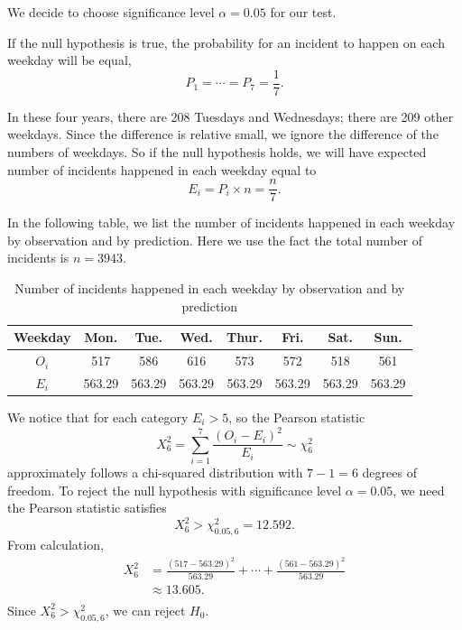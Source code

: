 \documentclass[11pt,a4paper,english]{article}
\begin{document}
We decide to choose significance level $\alpha = 0.05$ for our test.

If the null hypothesis is true, the probability for an incident to happen on each weekday will be equal,
\begin{equation*}
	P_{1} = \cdots = P_{7} = \frac{1}{7}.
\end{equation*}

In these four years, there are 208  Tuesdays and Wednesdays; there are 209 other weekdays. 
Since the difference is relative small, we ignore the difference of the numbers of weekdays.
So if the null hypothesis holds, we will have expected number of incidents happened in each weekday equal to
\begin{equation*}
	E_{i} = P_{i} \times n = \frac{n}{7}.
\end{equation*}

In the following table, we list the number of incidents happened in each weekday by observation and by prediction. 
Here we use the fact the total number of incidents is $n = 3943$.
\begin{table}[htbp]
	\centering
	\begin{tabular}{c|ccccccc}
		\hline
		Weekday & Mon. & Tue. & Wed. & Thur. & Fri. & Sat. & Sun.\\
		\hline
		$O_{i}$ & 517 & 586 & 616 & 573 & 572 & 518 & 561\\ \hline
		$E_{i}$ & 563.29 & 563.29 & 563.29 & 563.29 & 563.29 & 563.29 & 563.29\\
		\hline
	\end{tabular}
	\caption{Number of incidents happened in each weekday by observation and by prediction}
\end{table}

We notice that for each category $E_{i} > 5$, so the Pearson statistic
\begin{equation*}
	X^{2}_{6} = \sum_{i = 1}^{7}\frac{(O_{i} - E_{i})^{2}}{E_{i}}
	\sim \chi^{2}_{6}
\end{equation*}
approximately follows a chi-squared distribution with $7-1 = 6$ degrees of freedom. 
To reject the null hypothesis with significance level $\alpha = 0.05$, we need the Pearson statistic satisfies
\begin{equation*}
	X^{2}_{6} > \chi^{2}_{0.05,6} = 12.592.
\end{equation*}
From calculation,
\begin{align*}
	X^{2}_{6} &= \frac{(517-563.29)^{2}}{563.29}+\cdots+\frac{(561-563.29)^{2}}{563.29}\\
	&\approx 13.605.\\
\end{align*}
Since $X^{2}_{6} > \chi^{2}_{0.05,6}$, we can reject $H_{0}$.
\end{document}
